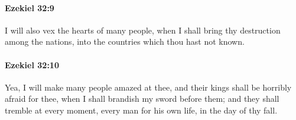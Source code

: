 		\paragraph{Ezekiel 32:9} %
			\label{EZEKIEL-32-9}

			I will also vex the hearts of many people, when I shall bring thy destruction among the nations, into the countries which thou hast not known.


		\paragraph{Ezekiel 32:10} %
			\label{EZEKIEL-32-10}

			Yea, I will make many people amazed at thee, and their kings shall be horribly afraid for thee, when I shall brandish my sword before them; and they shall tremble at every moment, every man for his own life, in the day of thy fall.

